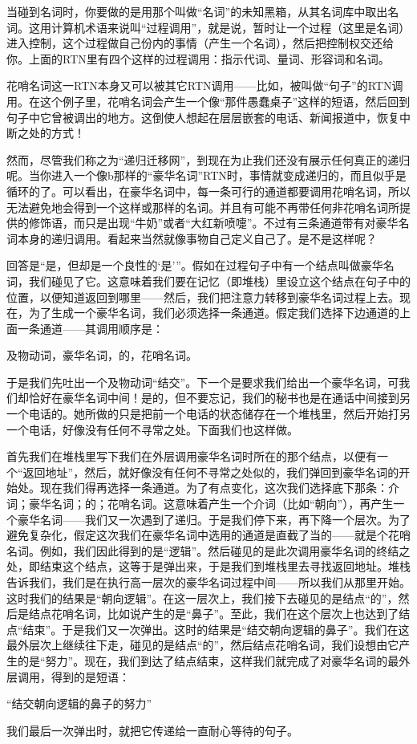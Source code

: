 当碰到名词时，你要做的是用那个叫做“名词”的未知黑箱，从其名词库中取出名词。这用计算机术语来说叫“过程调用”，就是说，暂时让一个过程（这里是名词）进入控制，这个过程做自己份内的事情（产生一个名词），然后把控制权交还给你。上面的RTN里有四个这样的过程调用：指示代词、量词、形容词和名词。

花哨名词这一RTN本身又可以被其它RTN调用——比如，被叫做“句子”的RTN调用。在这个例子里，花哨名词会产生一个像“那件愚蠢桌子”这样的短语，然后回到句子中它曾被调出的地方。这倒使人想起在层层嵌套的电话、新闻报道中，恢复中断之处的方式！

然而，尽管我们称之为“递归迁移网”，到现在为止我们还没有展示任何真正的递归呢。当你进入一个像b那样的“豪华名词”RTN时，事情就变成递归的，而且似乎是循环的了。可以看出，在豪华名词中，每一条可行的通道都要调用花哨名词，所以无法避免地会得到一个这样或那样的名词。并且有可能不再带任何非花哨名词所提供的修饰语，而只是出现“牛奶”或者“大红新喷嚏”。不过有三条通道带有对豪华名词本身的递归调用。看起来当然就像事物自己定义自己了。是不是这样呢？

回答是“是，但却是一个良性的‘是’”。假如在过程句子中有一个结点叫做豪华名词，我们碰见了它。这意味着我们要在记忆（即堆栈）里设立这个结点在句子中的位置，以便知道返回到哪里——然后，我们把注意力转移到豪华名词过程上去。现在，为了生成一个豪华名词，我们必须选择一条通道。假定我们选择下边通道的上面一条通道——其调用顺序是：
\begin{center}
及物动词，豪华名词，的，花哨名词。
\end{center}
于是我们先吐出一个及物动词“结交”。下一个是要求我们给出一个豪华名词，可我们却恰好在豪华名词中间！是的，但不要忘记，我们的秘书也是在通话中间接到另一个电话的。她所做的只是把前一个电话的状态储存在一个堆栈里，然后开始打另一个电话，好像没有任何不寻常之处。下面我们也这样做。

首先我们在堆栈里写下我们在外层调用豪华名词时所在的那个结点，以便有一个“返回地址”，然后，就好像没有任何不寻常之处似的，我们弹回到豪华名词的开始处。现在我们得再选择一条通道。为了有点变化，这次我们选择底下那条：介词；豪华名词；的；花哨名词。这意味着产生一个介词（比如“朝向”），再产生一个豪华名词——我们又一次遇到了递归。于是我们停下来，再下降一个层次。为了避免复杂化，假定这次我们在豪华名词中选用的通道是直截了当的——就是个花哨名词。例如，我们因此得到的是“逻辑”。然后碰见的是此次调用豪华名词的终结之处，即结束这个结点，这等于是弹出来，于是我们到堆栈里去寻找返回地址。堆栈告诉我们，我们是在执行高一层次的豪华名词过程中间——所以我们从那里开始。这时我们的结果是“朝向逻辑”。在这一层次上，我们接下去碰见的是结点“的”，然后是结点花哨名词，比如说产生的是“鼻子”。至此，我们在这个层次上也达到了结点“结束”。于是我们又一次弹出。这时的结果是“结交朝向逻辑的鼻子”。我们在这最外层次上继续往下走，碰见的是结点“的”，然后结点花哨名词，我们设想由它产生的是“努力”。现在，我们到达了结点结束，这样我们就完成了对豪华名词的最外层调用，得到的是短语：
\begin{center}
“结交朝向逻辑的鼻子的努力”
\end{center}
我们最后一次弹出时，就把它传递给一直耐心等待的句子。

